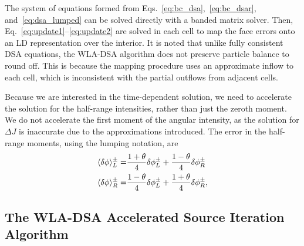 The system of equations formed from Eqs.~\eqref{eq:bc_dsa},~\eqref{eq:bc_dsar},
and~\eqref{eq:dsa_lumped} can be solved directly with a banded matrix solver. Then,
Eq.~\eqref{eq:update1}--\eqref{eq:update2} are solved in each cell to map the face errors onto
an LD representation over the interior.   It is noted that unlike fully consistent DSA equations, the WLA-DSA algorithm does not
preserve particle balance to round off.  This is because the mapping procedure uses an
approximate inflow to each cell, which is inconsistent with the partial outflows from
adjacent cells.

Because we are interested in the time-dependent solution, we need to accelerate the solution for the
half-range intensities, rather than just the zeroth moment. We do not accelerate the first
moment of the angular intensity, as the solution for $\Delta J$ is inaccurate due to the
approximations introduced.  The error in the half-range moments, using
the lumping notation, are 
\begin{align}
    \langle \delta \phi \rangle^{\pm}_L =&  \frac{1+\theta}{4}\delta \phi^{\pm}_{L} +
    \frac{1-\theta}{4}\delta \phi^{\pm}_{R}  \\
    \langle \delta \phi \rangle^{\pm}_R =&  \frac{1-\theta}{4}\delta \phi^{\pm}_{L} +
    \frac{1+\theta}{4}\delta \phi^{\pm}_{R}      ,
\end{align}

\subsection{The WLA-DSA Accelerated Source Iteration Algorithm}

